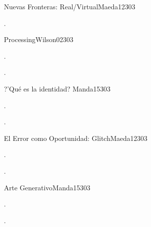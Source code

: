\begin{syllabus}
\begin{unit}{Nuevas Fronteras: Real/Virtual}{}{Maeda12}{30}{3}
   \begin{learningoutcomes}
      \item .
   \end{learningoutcomes}
\end{unit}

\begin{unit}{Processing}{}{Wilson02}{30}{3}
   \begin{topics}
      \item . 
   \end{topics}

   \begin{learningoutcomes}
      \item .
   \end{learningoutcomes}
\end{unit}

\begin{unit}{?'Qué es la identidad? }{}{Manda15}{30}{3}
   \begin{topics}
      \item . 
   \end{topics}

   \begin{learningoutcomes}
      \item . 
   \end{learningoutcomes}
\end{unit}

\begin{unit}{El Error como Oportunidad: Glitch}{}{Maeda12}{30}{3}
   \begin{topics}
      \item .
   \end{topics}

   \begin{learningoutcomes}
      \item . 
   \end{learningoutcomes}
\end{unit}

\begin{unit}{Arte Generativo}{}{Manda15}{30}{3}
   \begin{topics}
      \item . 
   \end{topics}

   \begin{learningoutcomes}
      \item . 
   \end{learningoutcomes}
\end{unit}


\end{syllabus}
